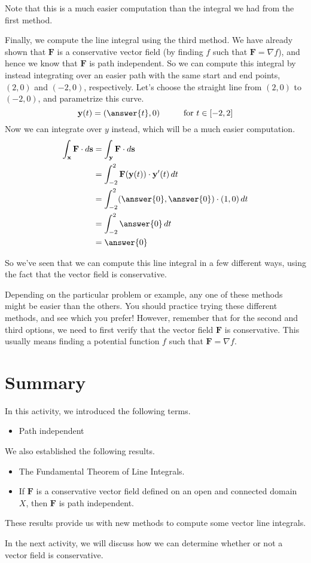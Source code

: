 \documentclass{ximera}
\begin{document}
\begin{example}
\begin{explanation}
Note that this is a much easier computation than the integral we had from the first method.

Finally, we compute the line integral using the third method. We have already shown that $\mathbf{F}$ is a conservative vector field (by finding $f$ such that $\mathbf{F}=\nabla f$), and hence we know that $\mathbf{F}$ is path independent. So we can compute this integral by instead integrating over an easier path with the same start and end points, $(2,0)$ and $(-2,0)$, respectively. Let's choose the straight line from $(2,0)$ to $(-2,0)$, and parametrize this curve.
\[
\textbf{y}(t)=(\answer{t}, 0)\hspace{1cm} \textrm{for }t\in[-2,2]
\]
Now we can integrate over $y$ instead, which will be a much easier computation.
\begin{align*}
\int_{\textbf{x}}\textbf{F}\cdot d\textbf{s}  &= \int_{\textbf{y}}\textbf{F}\cdot d\textbf{s}\\
&= \int_{-2}^{2} \textbf{F}(\textbf{y}(t))\cdot \textbf{y}'(t)\,dt\\
&= \int_{-2}^{2} (\answer{0},\answer{0})\cdot (1,0)\,dt\\
&= \int_{-2}^{2} \answer{0}\,dt\\
&= \answer{0}
\end{align*}

So we've seen that we can compute this line integral in a few different ways, using the fact that the vector field is conservative.
\end{explanation}
\end{example}

Depending on the particular problem or example, any one of these methods might be easier than the others. You should practice trying these different methods, and see which you prefer! However, remember that for the second and third options, we need to first verify that the vector field $\mathbf{F}$ is conservative. This usually means finding a potential function $f$ such that $\mathbf{F}=\nabla f$.

\section*{Summary}

In this activity, we introduced the following terms.
\begin{itemize}
\item Path independent
\end{itemize}
We also established the following results.
\begin{itemize}
\item The Fundamental Theorem of Line Integrals.
\item If $\textbf{F}$ is a conservative vector field defined on an open and connected domain $X$, then $\textbf{F}$ is path independent.
\end{itemize}

These results provide us with new methods to compute some vector line integrals.

In the next activity, we will discuss how we can determine whether or not a vector field is conservative.
\end{document}

